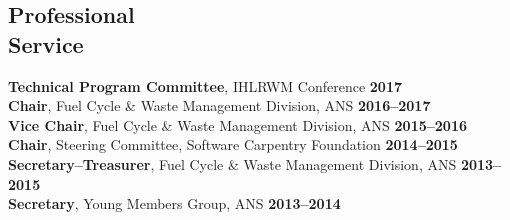 \documentclass[margin,line]{resume}
\begin{document}
\begin{resume}
    \section{\mysidestyle Professional\\Service}
		\textbf{Technical Program Committee}, IHLRWM Conference \hfill \textbf{2017}\vspace{.5mm}\\%
		\textbf{Chair}, Fuel Cycle \& Waste Management Division, ANS  \hfill \textbf{2016--2017}\vspace{.5mm}\\%
		\textbf{Vice Chair}, Fuel Cycle \& Waste Management Division, ANS  \hfill \textbf{2015--2016}\vspace{.5mm}\\%
		\textbf{Chair}, Steering Committee, Software Carpentry Foundation   \hfill \textbf{2014--2015}\vspace{.5mm}\\%
		\textbf{Secretary--Treasurer}, Fuel Cycle \& Waste Management Division, ANS  \hfill \textbf{2013--2015}\vspace{.5mm}\\%
		\textbf{Secretary}, Young Members Group, ANS  \hfill \textbf{2013--2014}%

\end{resume}
\end{document}
